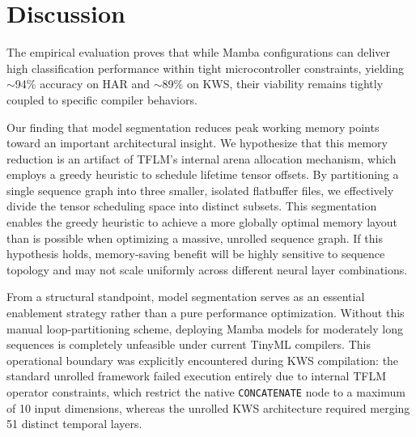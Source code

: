 \section{Discussion}
\label{sec:discussion}

The empirical evaluation proves that while Mamba configurations can deliver high classification performance within tight microcontroller constraints, yielding $\sim$94\% accuracy on HAR and $\sim$89\% on KWS, their viability remains tightly coupled to specific compiler behaviors.

Our finding that model segmentation reduces peak working memory points toward an important architectural insight. We hypothesize that this memory reduction is an artifact of TFLM's internal arena allocation mechanism, which employs a greedy heuristic to schedule lifetime tensor offsets. By partitioning a single sequence graph into three smaller, isolated flatbuffer files, we effectively divide the tensor scheduling space into distinct subsets. This segmentation enables the greedy heuristic to achieve a more globally optimal memory layout than is possible when optimizing a massive, unrolled sequence graph. If this hypothesis holds, memory-saving benefit will be highly sensitive to sequence topology and may not scale uniformly across different neural layer combinations.

From a structural standpoint, model segmentation serves as an essential enablement strategy rather than a pure performance optimization. Without this manual loop-partitioning scheme, deploying Mamba models for moderately long sequences is completely unfeasible under current TinyML compilers. This operational boundary was explicitly encountered during KWS compilation: the standard unrolled framework failed execution entirely due to internal TFLM operator constraints, which restrict the native \texttt{CONCATENATE} node to a maximum of 10 input dimensions, whereas the unrolled KWS architecture required merging 51 distinct temporal layers.

